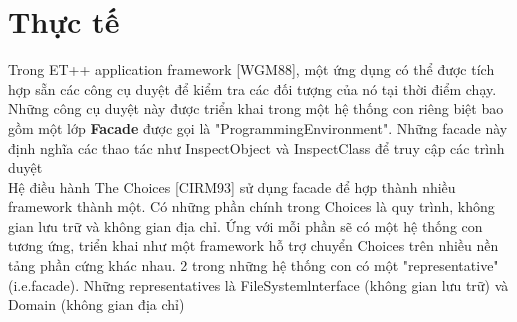\section{Thực tế}

Trong ET++ application framework [WGM88], một ứng dụng có thể được tích hợp sẵn các công cụ duyệt để kiểm tra các đối tượng của nó tại thời điểm chạy. Những công cụ duyệt này được triển khai trong một hệ thống con riêng biệt bao gồm một lớp \textbf{Facade} được gọi là "ProgrammingEnvironment". Những facade này định nghĩa các thao tác như InspectObject và InspectClass để truy cập các trình duyệt\\[0.1in]
Hệ điều hành The Choices [CIRM93] sử dụng facade để hợp thành nhiều framework thành một. Có những phần chính trong Choices là quy trình, không gian lưu trữ và không gian địa chỉ. Ứng với mỗi phần sẽ có một hệ thống con tương ứng, triển khai như một framework hỗ trợ chuyển Choices trên nhiều nền tảng phần cứng khác nhau. 2 trong những hệ thống con có một "representative" (i.e.facade). Những representatives là FileSystemlnterface (không gian lưu trữ) và Domain (không gian địa chỉ)

\newpage
